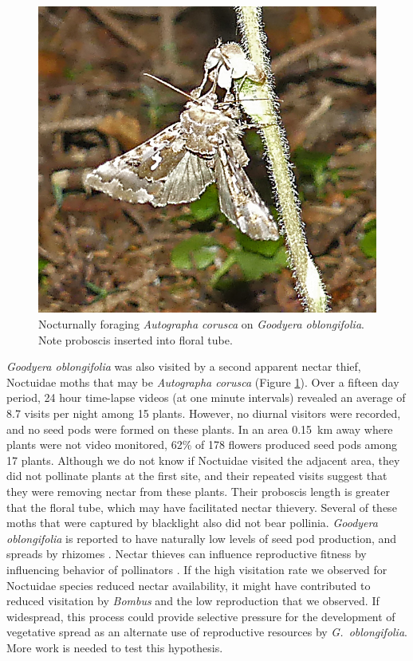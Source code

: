\begin{multicols}{2}
\begin{figure}[H]
\begin{center}
\vspace{2mm}
\includegraphics[width=\textwidth]{img/Goodyera_oblongifolia_Noctuidae.jpg}
\caption{Nocturnally foraging \emph{Autographa corusca} on \emph{Goodyera oblongifolia}.  Note proboscis inserted into floral tube.}
\label{Goodyera_oblongifolia_Noctuidae}
\end{center}
\end{figure}



\emph{Goodyera oblongifolia} was also visited by a second apparent
nectar thief, Noctuidae moths that may be \emph{Autographa corusca}
(Figure \ref{Goodyera_oblongifolia_Noctuidae}). Over a fifteen day period, 24 hour time-lapse videos (at
one minute intervals) revealed an average of 8.7 visits per night
among 15 plants. However, no diurnal visitors were recorded, and no seed
pods were formed on these plants. In an area 0.15~km away where plants
were not video monitored, 62\% of 178 flowers produced seed pods among
17 plants. Although we do not know if Noctuidae visited the adjacent
area, they did not pollinate plants at the first site, and their
repeated visits suggest that they were removing nectar from these
plants. Their proboscis length is greater that the floral tube, which
may have facilitated nectar thievery. Several of these moths that were
captured by blacklight also did not bear pollinia. \emph{Goodyera
oblongifolia} is reported to have naturally low levels of seed pod
production, and spreads by rhizomes \citep{Ackerman1975}. Nectar thieves can
influence reproductive fitness by influencing behavior of pollinators
\citep{Zhangetal2014}. If the high visitation rate we observed for
Noctuidae species reduced nectar availability, it might have contributed
to reduced visitation by \emph{Bombus} and the low reproduction that we
observed. If widespread, this process could provide selective pressure
for the development of vegetative spread as an alternate use of
reproductive resources by \emph{G.\ oblongifolia}. More work is needed to
test this hypothesis.


\end{multicols}
